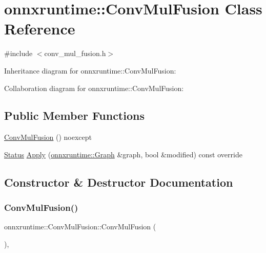 \hypertarget{classonnxruntime_1_1ConvMulFusion}{}\section{onnxruntime\+:\+:Conv\+Mul\+Fusion Class Reference}
\label{classonnxruntime_1_1ConvMulFusion}


{\ttfamily \#include $<$conv\+\_\+mul\+\_\+fusion.\+h$>$}



Inheritance diagram for onnxruntime\+:\+:Conv\+Mul\+Fusion\+:


Collaboration diagram for onnxruntime\+:\+:Conv\+Mul\+Fusion\+:
\subsection*{Public Member Functions}
\begin{DoxyCompactItemize}
\item 
\mbox{\hyperlink{classonnxruntime_1_1ConvMulFusion_a51249abfc950052d3fa41311089e260f}{Conv\+Mul\+Fusion}} () noexcept
\item 
\mbox{\hyperlink{classonnxruntime_1_1common_1_1Status}{Status}} \mbox{\hyperlink{classonnxruntime_1_1ConvMulFusion_abea2001e37642a6e2c667e115b6b23f0}{Apply}} (\mbox{\hyperlink{classonnxruntime_1_1Graph}{onnxruntime\+::\+Graph}} \&graph, bool \&modified) const override
\end{DoxyCompactItemize}


\subsection{Constructor \& Destructor Documentation}
\mbox{\label{classonnxruntime_1_1ConvMulFusion_a51249abfc950052d3fa41311089e260f}} 
\subsubsection{\texorpdfstring{Conv\+Mul\+Fusion()}{ConvMulFusion()}}
{\footnotesize\ttfamily onnxruntime\+::\+Conv\+Mul\+Fusion\+::\+Conv\+Mul\+Fusion (\begin{DoxyParamCaption}{ }\end{DoxyParamCaption})\hspace{0.3cm}{\ttfamily [inline]}, {\ttfamily [noexcept]}}




